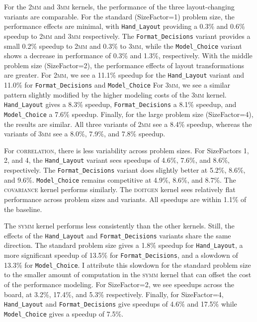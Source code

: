 For the \textsc{2mm} and \textsc{3mm} kernels, the performance of the three layout-changing variants are comparable. 
For the standard (SizeFactor=1) problem size, the performance effects are minimal, with \verb.Hand_Layout. providing a 0.3\% and 0.6\% speedup to \textsc{2mm} and \textsc{3mm} respectively. 
The \verb.Format_Decisions. variant provides a small 0.2\% speedup to \textsc{2mm} and 0.3\% to \textsc{3mm}, while the \verb.Model_Choice. variant shows a decrease in performance of 0.3\% and 1.3\%, respectively. 
With the middle problem size (SizeFactor=2), the performance effects of layout transformations are greater. 
For \textsc{2mm}, we see a 11.1\% speedup for the \verb.Hand_Layout. variant and 11.0\% for \verb.Format_Decisions. and \verb.Model_Choice. 
For \textsc{3mm}, we see a similar pattern slightly modified by the higher modeling costs of the \textsc{3mm} kernel. \verb.Hand_Layout. gives a 8.3\% speedup, \verb.Format_Decisions. a 8.1\% speedup, and \verb.Model_Choice. a 7.6\% speedup.
Finally, for the large problem size (SizeFactor=4), the results are similar.
All three variants of \textsc{2mm} see a 8.4\% speedup, whereas the variants of \textsc{3mm} see a 8.0\%, 7.9\%, and 7.8\% speedup.

For \textsc{correlation}, there is less variability across problem sizes. 
For SizeFactors 1, 2, and 4, the \verb.Hand_Layout. variant sees speedups of 4.6\%, 7.6\%, and 8.6\%, respectively. 
The \verb.Format_Decisions. variant does slightly better at 5.2\%, 8.6\%, and 9.6\%.
\verb.Model_Choice. remains competitive at 4.9\%, 8.6\%, and 8.7\%.
The \textsc{covariance} kernel performs similarly.
The \textsc{doitgen} kernel sees relatively flat performance across problem sizes and variants. All speedups are within 1.1\% of the baseline.

The \textsc{symm} kernel performs less consistently than the other kernels.
Still, the effects of the \verb.Hand_Layout. and \verb.Format_Decisions. variants share the same direction.
The standard problem size gives a 1.8\% speedup for \verb.Hand_Layout., a more significant speedup of 13.5\% for \verb.Format_Decisions., and a slowdown of 13.3\% for \verb.Model_Choice.. 
I attribute this slowdown for the standard problem size to the smaller amount of computation in the \textsc{symm} kernel that can offset the cost of the performance modeling. 
For SizeFactor=2, we see speedups across the board, at 3.2\%, 17.4\%, and 5.3\% respectively.
Finally, for SizeFactor=4, \verb.Hand_Layout. and \verb.Format_Decisions. give speedups of 4.6\% and 17.5\% while \verb.Model_Choice. gives a speedup of 7.5\%.


